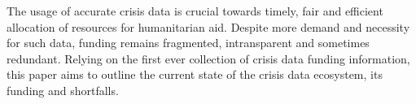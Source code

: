 The usage of accurate crisis data is crucial towards timely, fair and efficient allocation of resources for humanitarian aid. Despite more demand and necessity for such data, funding remains fragmented, intransparent and sometimes redundant. Relying on the first ever collection of crisis data funding information, this paper aims to outline the current state of the crisis data ecosystem, its funding and shortfalls.